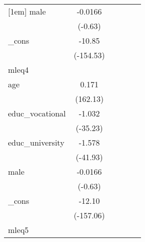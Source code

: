 {\begin{tabular}{l*{5}{c}}
[1em]
male        &     -0.0166         &                     &                     &                     &                     \\
            &     (-0.63)         &                     &                     &                     &                     \\
[1em]
\_cons      &      -10.85\sym{***}&                     &                     &                     &                     \\
            &   (-154.53)         &                     &                     &                     &                     \\
\hline
mleq4       &                     &                     &                     &                     &                     \\
age         &       0.171\sym{***}&                     &                     &                     &                     \\
            &    (162.13)         &                     &                     &                     &                     \\
[1em]
educ\_vocational&      -1.032\sym{***}&                     &                     &                     &                     \\
            &    (-35.23)         &                     &                     &                     &                     \\
[1em]
educ\_university&      -1.578\sym{***}&                     &                     &                     &                     \\
            &    (-41.93)         &                     &                     &                     &                     \\
[1em]
male        &     -0.0166         &                     &                     &                     &                     \\
            &     (-0.63)         &                     &                     &                     &                     \\
[1em]
\_cons      &      -12.10\sym{***}&                     &                     &                     &                     \\
            &   (-157.06)         &                     &                     &                     &                     \\
\hline
mleq5       &                     &                     &                     &                     &                     \\

\end{tabular}}
